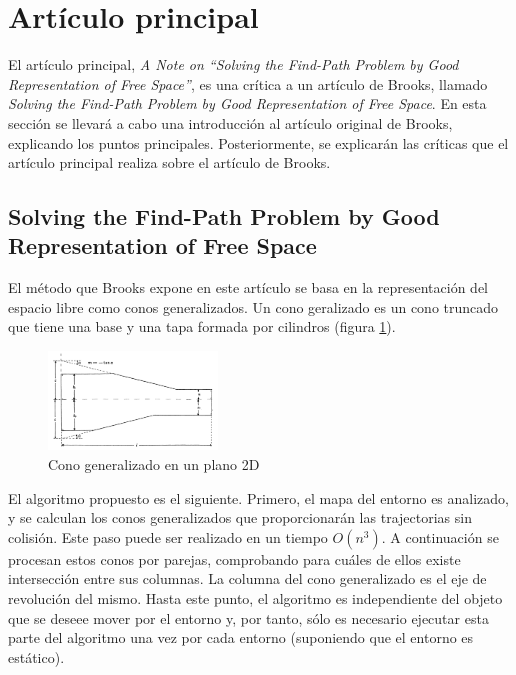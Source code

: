 \section{Artículo principal}
\label{articulo_principal}


El artículo principal, \textit{A Note on ``Solving the Find-Path Problem by Good Representation of Free Space''}, es una crítica a un artículo de Brooks, llamado \textit{Solving the Find-Path Problem by Good Representation of Free Space}. En esta sección se llevará a cabo una introducción al artículo original de Brooks, explicando los puntos principales. Posteriormente, se explicarán las críticas que el artículo principal realiza sobre el artículo de Brooks.

\subsection{Solving the Find-Path Problem by Good Representation of Free Space}

El método que Brooks expone en este artículo se basa en la representación del espacio libre como conos generalizados. Un cono geralizado es un cono truncado que tiene una base y una tapa formada por cilindros (figura \ref{fig:cono_generalizado}).\\

\begin{figure}[h]
		\centering
        \includegraphics[width=0.4\textwidth]{images/cono_gen.png}
        \caption{Cono generalizado en un plano 2D}
        \label{fig:cono_generalizado}
\end{figure} 

El algoritmo propuesto es el siguiente. Primero, el mapa del entorno es analizado, y se calculan los conos generalizados que proporcionarán las trajectorias sin colisión. Este paso puede ser realizado en un tiempo $O(n^3)$. A continuación se procesan estos conos por parejas, comprobando para cuáles de ellos existe intersección entre sus columnas. La columna del cono generalizado es el eje de revolución del mismo. Hasta este punto, el algoritmo es independiente del objeto que se deseee mover por el entorno y, por tanto, sólo es necesario ejecutar esta parte del algoritmo una vez por cada entorno (suponiendo que el entorno es estático).\\

